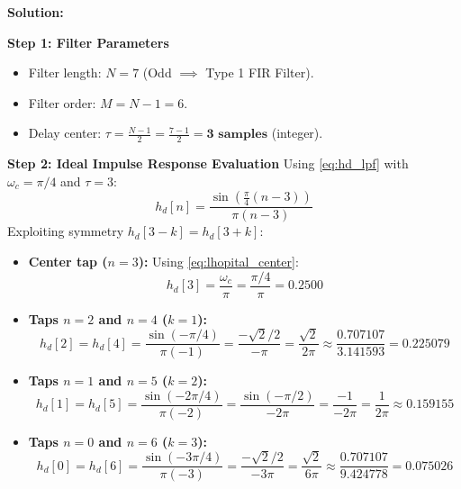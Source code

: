 \documentclass[11pt,a4paper]{article}
\begin{document}
\vspace{1mm}
\noindent\textbf{Solution:}

\noindent\textbf{Step 1: Filter Parameters}
\begin{itemize}
    \item Filter length: $N = 7$ (Odd $\implies$ Type 1 FIR Filter).
    \item Filter order: $M = N - 1 = 6$.
    \item Delay center: $\tau = \frac{N-1}{2} = \frac{7-1}{2} = \mathbf{3 \text{ samples}}$ (integer).
\end{itemize}

\vspace{1mm}
\noindent\textbf{Step 2: Ideal Impulse Response Evaluation}
Using \eqref{eq:hd_lpf} with $\omega_c = \pi/4$ and $\tau = 3$:
\begin{equation}
h_d[n] = \frac{\sin\left(\frac{\pi}{4}(n - 3)\right)}{\pi(n - 3)}
\end{equation}
Exploiting symmetry $h_d[3 - k] = h_d[3 + k]$:
\begin{itemize}
    \item \textbf{Center tap ($n = 3$):} Using \eqref{eq:lhopital_center}:
    \begin{equation}
    h_d[3] = \frac{\omega_c}{\pi} = \frac{\pi/4}{\pi} = \mathbf{0.2500}
    \end{equation}
    \item \textbf{Taps $n = 2$ and $n = 4$ ($k = 1$):}
    \begin{equation}
    h_d[2] = h_d[4] = \frac{\sin(-\pi/4)}{\pi(-1)} = \frac{-\sqrt{2}/2}{-\pi} = \frac{\sqrt{2}}{2\pi} \approx \frac{0.707107}{3.141593} = \mathbf{0.225079}
    \end{equation}
    \item \textbf{Taps $n = 1$ and $n = 5$ ($k = 2$):}
    \begin{equation}
    h_d[1] = h_d[5] = \frac{\sin(-2\pi/4)}{\pi(-2)} = \frac{\sin(-\pi/2)}{-2\pi} = \frac{-1}{-2\pi} = \frac{1}{2\pi} \approx \mathbf{0.159155}
    \end{equation}
    \item \textbf{Taps $n = 0$ and $n = 6$ ($k = 3$):}
    \begin{equation}
    h_d[0] = h_d[6] = \frac{\sin(-3\pi/4)}{\pi(-3)} = \frac{-\sqrt{2}/2}{-3\pi} = \frac{\sqrt{2}}{6\pi} \approx \frac{0.707107}{9.424778} = \mathbf{0.075026}
    \end{equation}
\end{itemize}
\end{document}
